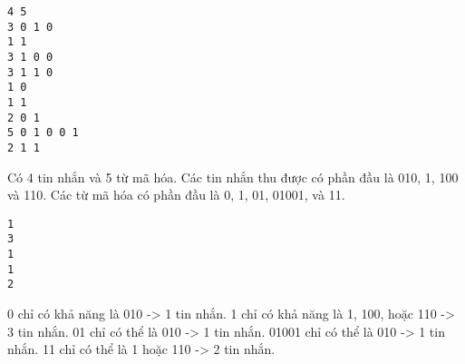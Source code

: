 \begin{verbatim}
4 5
3 0 1 0
1 1
3 1 0 0
3 1 1 0
1 0
1 1
2 0 1
5 0 1 0 0 1
2 1 1
\end{verbatim}
Có 4 tin nhắn và 5 từ mã hóa. Các tin nhắn thu được có phần đầu là 010, 1, 100 và 110. Các từ mã hóa có phần đầu là 0, 1, 01, 01001, và 11.
\begin{verbatim}
1
3
1
1
2
\end{verbatim}
0 chỉ có khả năng là 010 -> 1 tin nhắn. 1 chỉ có khả năng là 1, 100, hoặc 110 -> 3 tin nhắn. 01 chỉ có thể là 010 -> 1 tin nhắn. 01001 chỉ có thể là 010 -> 1 tin nhắn. 11 chỉ có thể là 1 hoặc 110 -> 2 tin nhắn.